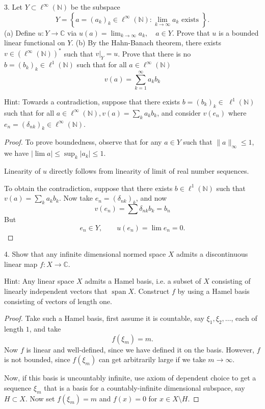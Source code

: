 \begin{problem}
	3. Let $Y \subset \ell^{\infty}(\mathbb{N})$ be the subspace
\[
Y=\left\{a=\left(a_k\right)_k \in \ell^{\infty}(\mathbb{N}): \lim _{k \rightarrow \infty} a_k \text { exists }\right\} .
\]
(a) Define $u: Y \rightarrow \mathbb{C}$ via $u(a)=\lim _{k \rightarrow \infty} a_k, \quad a \in Y$.
Prove that $u$ is a bounded linear functional on $Y$.
(b) By the Hahn-Banach theorem, there exists $v \in\left(\ell^{\infty}(\mathbb{N})\right)^*$ such that $\left.v\right|_Y=u$. Prove that there is no $b=\left(b_k\right)_k \in \ell^1(\mathbb{N})$ such that for all $a \in \ell^{\infty}(\mathbb{N})$
\[
v(a)=\sum_{k=1}^{\infty} a_k b_k
\]

Hint: Towards a contradiction, suppose that there exists $b=\left(b_k\right)_k \in$ $\ell^1(\mathbb{N})$ such that for all $a \in \ell^{\infty}(\mathbb{N}), v(a)=\sum_k a_k b_k$, and consider $v\left(e_n\right)$ where $e_n=\left(\delta_{n k}\right)_k \in \ell^{\infty}(\mathbb{N})$.
\end{problem}
\begin{proof}
	To prove boundedness, observe that for any $a \in Y $ such that $\|a\|_\infty \le 1$, we have $|\lim a| \le \sup _k |a_k| \le 1$. 

	Linearity of $u$ directly follows from linearity of limit of real number sequences.

	To obtain the contradiction, suppose that there exists $b \in \ell^1(\mathbb{N})$ such that $v(a) = \sum_k a_k b_k$. Now take $e_n = (\delta_{n k})_k$, and now
	\[
		v(e_n) = \sum \delta_{n k} b_k = b_n
	\] 
	But
	\[
		e_n \in Y, \qquad u(e_n) = \lim e_n = 0
	.\] 
\end{proof}


\begin{problem}
	4. Show that any infinite dimensional normed space $X$ admits a discontinuous linear map $f: X \rightarrow \mathbb{C}$.

Hint: Any linear space $X$ admits a Hamel basis, i.e. a subset of $X$ consisting of linearly independent vectors that $\operatorname{span} X$. Construct $f$ by using a Hamel basis consisting of vectors of length one.
\end{problem}
\begin{proof}
	Take such a Hamel basis, first assume it is countable, say $\xi_1, \xi_2, \ldots$, each of length $1$, and take
	\[
		f(\xi_m) = m
	.\] 
	Now $f$ is linear and well-defined, since we have defined it on the basis. However, $f$ is not bounded, since  $f(\xi_m)$ can get arbitrarily large if we take $m \to  \infty $.

	Now, if this basis is uncountably infinite, use axiom of dependent choice to get a sequence $\xi_m$ that is a basis for a countably-infinite dimensional subspace, say $H \subset X$. Now set $f(\xi_m) = m$ and $f(x) = 0$ for $x \in X \setminus H$.
\end{proof}

